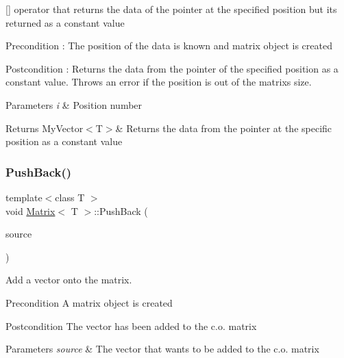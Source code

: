 \mbox{[}\mbox{]} operator that returns the data of the pointer at the specified position but its returned as a constant value 

\begin{DoxyPrecond}{Precondition}
\+: The position of the data is known and matrix object is created 
\end{DoxyPrecond}
\begin{DoxyPostcond}{Postcondition}
\+: Returns the data from the pointer of the specified position as a constant value. Throws an error if the position is out of the matrix\textquotesingle{}s size. 
\end{DoxyPostcond}

\begin{DoxyParams}{Parameters}
{\em i} & Position number \\
\hline
\end{DoxyParams}
\begin{DoxyReturn}{Returns}
My\+Vector$<$\+T$>$\& Returns the data from the pointer at the specific position as a constant value 
\end{DoxyReturn}
\mbox{\label{class_matrix_af61aaa671b6bd354b27fb3aabbb65a9d}} 
\subsubsection{\texorpdfstring{PushBack()}{PushBack()}}
{\footnotesize\ttfamily template$<$class T $>$ \\
void \mbox{\hyperlink{class_matrix}{Matrix}}$<$ T $>$\+::Push\+Back (\begin{DoxyParamCaption}\item[{const \mbox{\hyperlink{class_my_vector}{My\+Vector}}$<$ T $>$ \&}]{source }\end{DoxyParamCaption})}



Add a vector onto the matrix. 

\begin{DoxyPrecond}{Precondition}
A matrix object is created 
\end{DoxyPrecond}
\begin{DoxyPostcond}{Postcondition}
The vector has been added to the c.\+o. matrix
\end{DoxyPostcond}

\begin{DoxyParams}{Parameters}
{\em source} & The vector that wants to be added to the c.\+o. matrix \\
\hline
\end{DoxyParams}
\mbox{\label{class_matrix_a86d55a5db43b641f4e8fb2b302ccc599}} 
